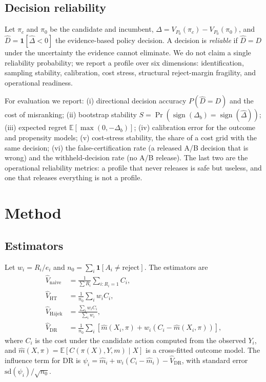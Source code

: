 \documentclass[conference]{IEEEtran}
\newcommand{\Pzero}{\ensuremath{P_0}}
\begin{document}
\subsection{Decision reliability}
Let $\pi_c$ and $\pi_0$ be the candidate and incumbent, $\Delta=V_{\Pzero}(\pi_c)-V_{\Pzero}(\pi_0)$, and $\hat D=\mathbf{1}[\hat\Delta<0]$ the evidence-based policy decision. A decision is \emph{reliable} if $\hat D=D$ under the uncertainty the evidence cannot eliminate. We do not claim a single reliability probability; we report a profile over six dimensions: identification, sampling stability, calibration, cost stress, structural reject-margin fragility, and operational readiness.

For evaluation we report: (i) directional decision accuracy $P(\hat D=D)$ and the cost of misranking; (ii) bootstrap stability $S=\Pr(\operatorname{sign}(\Delta_b)=\operatorname{sign}(\hat\Delta))$; (iii) expected regret $\mathbb{E}[\max(0,-\Delta_b)]$; (iv) calibration error for the outcome and propensity models; (v) cost-stress stability, the share of a cost grid with the same decision; (vi) the false-certification rate (a released A/B decision that is wrong) and the withheld-decision rate (no A/B release). The last two are the operational reliability metrics: a profile that never releases is safe but useless, and one that releases everything is not a profile.

\section{Method}

\subsection{Estimators}
Let $w_i=R_i/e_i$ and $n_0=\sum_i\mathbf{1}[A_i\neq\text{reject}]$. The estimators are
\begin{align}
\hat{V}_{\text{naive}}&=\frac{1}{\sum R_i}\sum_{i:R_i=1}C_i,\\
\hat{V}_{\text{HT}}&=\frac{1}{n_0}\sum_i w_i C_i,\\
\hat{V}_{\text{H\'ajek}}&=\frac{\sum_i w_i C_i}{\sum_i w_i},\\
\hat{V}_{\text{DR}}&=\frac{1}{n_0}\sum_i\left[\hat{m}(X_i,\pi)+w_i\left(C_i-\hat{m}(X_i,\pi)\right)\right],
\end{align}
where $C_i$ is the cost under the candidate action computed from the observed $Y_i$, and $\hat{m}(X,\pi)=\mathbb{E}[C(\pi(X),Y,m)\mid X]$ is a cross-fitted outcome model. The influence term for DR is $\psi_i=\hat{m}_i+w_i(C_i-\hat{m}_i)-\hat{V}_{\text{DR}}$, with standard error $\mathrm{sd}(\psi_i)/\sqrt{n_0}$.
\end{document}
